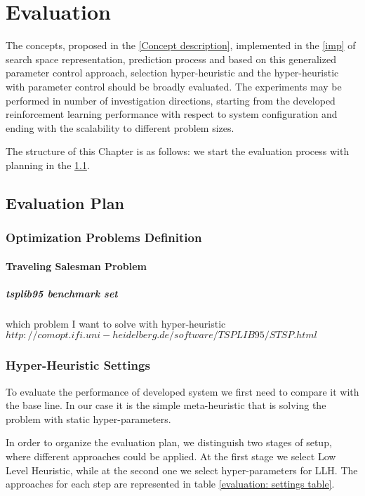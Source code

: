 \chapter{Evaluation}\label{eval}
The concepts, proposed in the \cref{Concept description}, implemented in the \cref{imp} of search space representation, prediction process and based on this generalized parameter control approach, selection hyper-heuristic and the hyper-heuristic with parameter control should be broadly evaluated. The experiments may be performed in number of investigation directions, starting from the developed reinforcement learning performance with respect to system configuration and ending with the scalability to different problem sizes.

The structure of this Chapter is as follows: we start the evaluation process with planning in the \cref{eval: plan}.

\section{Evaluation Plan}\label{eval: plan}

\subsection{Optimization Problems Definition}
\subsubsection{Traveling Salesman Problem}
\paragraph{tsplib95 benchmark set}
which problem I want to solve with hyper-heuristic
$http://comopt.ifi.uni-heidelberg.de/software/TSPLIB95/STSP.html$

\subsection{Hyper-Heuristic Settings}
To evaluate the performance of developed system we first need to compare it with the base line. In our case it is the simple meta-heuristic that is solving the problem with static hyper-parameters.

In order to organize the evaluation plan, we distinguish two stages of setup, where different approaches could be applied. 
At the first stage we select Low Level Heuristic, while at the second one we select hyper-parameters for LLH.
The approaches for each step are represented in table \ref{evaluation: settings table}.

